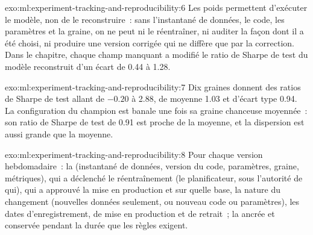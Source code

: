\begin{solution}{exo:ml:experiment-tracking-and-reproducibility:6}
Les poids permettent d'exécuter le modèle, non de le reconstruire~: sans l'instantané de données, le code, les paramètres et la graine, on ne peut
ni le réentraîner, ni auditer la façon dont il a été choisi, ni produire une version corrigée qui ne diffère que par la correction. Dans le chapitre, chaque champ manquant a modifié
le ratio de Sharpe de test du modèle reconstruit d'un écart de 0.44 à 1.28.
\end{solution}

\begin{solution}{exo:ml:experiment-tracking-and-reproducibility:7}
Dix graines donnent des ratios de Sharpe de test allant de $-0.20$ à 2.88, de moyenne 1.03 et d'écart type 0.94. La configuration du champion est
banale une fois sa graine chanceuse moyennée~: son ratio de Sharpe de test de 0.91 est proche de la moyenne, et la dispersion est aussi grande que
la moyenne.
\end{solution}

\begin{solution}{exo:ml:experiment-tracking-and-reproducibility:8}
Pour chaque version hebdomadaire~: la  (instantané de données, version du code, paramètres, graine, métriques), qui a déclenché le réentraînement (le
planificateur, sous l'autorité de qui), qui a approuvé la mise en production et sur quelle base, la nature du changement (nouvelles données seulement, ou nouveau
code ou paramètres), les dates d'enregistrement, de mise en production et de retrait~; la  ancrée et conservée pendant la durée que
les règles exigent.
\end{solution}

